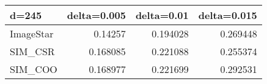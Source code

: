 \begin{tabular}{lrrr}
\hline
 d=245     &   delta=0.005 &   delta=0.01 &   delta=0.015 \\
\hline
 ImageStar &      0.14257  &     0.194028 &      0.269448 \\
 SIM\_CSR   &      0.168085 &     0.221088 &      0.255374 \\
 SIM\_COO   &      0.168977 &     0.221699 &      0.292531 \\
\hline
\end{tabular}
